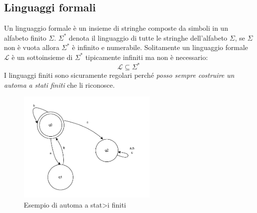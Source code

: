 \documentclass[a4paper]{article}
\begin{document}
\subsection{Linguaggi formali}
{
    Un linguaggio formale è un insieme di stringhe composte da simboli in un alfabeto finito $\Sigma$.
}
\noindent
$\Sigma^*$ denota il linguaggio di tutte le stringhe dell'alfabeto $\Sigma$, se $\Sigma$ non è vuota allora $\Sigma^*$ è 
infinito e numerabile.
Solitamente un linguaggio formale $\mathcal{L}$ è un sottoinsieme di $\Sigma^*$ tipicamente infiniti ma non è necessario:
\[\mathcal{L} \subseteq \Sigma^*\]
I linguaggi finiti sono sicuramente regolari perché \textit{posso sempre costruire un automa a stati finiti} che li riconosce.

\begin{figure}[H]
    \centering
\end{figure}


\begin{figure}[H]
    \centering
    \includegraphics[width=0.6\textwidth]{automa.pdf}
    \caption{Esempio di automa a stat>i finiti}
\end{figure}
\end{document}
